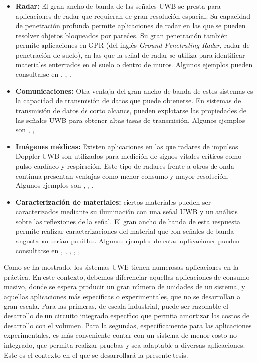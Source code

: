 \begin{itemize}
  \item \textbf{Radar:} El gran ancho de banda de las señales UWB se presta
        para aplicaciones de radar que requieran de gran resolución espacial. Su
        capacidad de penetración profunda permite aplicaciones de radar en las
        que se pueden resolver objetos bloqueados por paredes. Su gran
        penetración también permite aplicaciones en GPR (del inglés
        \textit{Ground Penetrating Radar}, radar de penetración de suelo), en
        las que la señal de radar se utiliza para identificar materiales
        enterrados en el suelo o dentro de muros. Algunos ejemplos
        pueden consultarse en \cite{morales2018}, \cite{savelyev2010},
        \cite{senapati2021}.
  \item \textbf{Comunicaciones:} Otra ventaja del gran ancho de banda de estos
        sistemas es la capacidad de transmisión de datos que puede obtenerse.  En
        sistemas de transmisión de datos de corto alcance, pueden explotarse las
        propiedades de las señales UWB para obtener altas tasas de transmisión.
        Algunos ejemplos son \cite{jaesang2004}, \cite{zhiquan2005},
        \cite{Heydari2005}
  \item \textbf{Imágenes médicas:} Existen aplicaciones en las que radares de
        impulsos Doppler UWB son utilizados para medición de signos vitales
        críticos como pulso cardíaco y respiración. Este tipo de radares frente
        a otros de onda continua presentan ventajas como menor consumo y mayor
        resolución. Algunos ejemplos son \cite{jalivand2011}, \cite{oloumi2020},
        \cite{jalivand2011_2}.
  \item \textbf{Caracterización de materiales:} ciertos materiales pueden ser
      caracterizados mediante su iluminación con una señal UWB y un análisis
        sobre las reflexiones de la señal. El gran ancho de banda de esta
        respuesta permite realizar caracterizaciones del material que con
        señales de banda angosta no serían posibles. Algunos ejemplos de estas
        aplicaciones pueden consultarse en \cite{altieri2017},
        \cite{Salman2008}, \cite{Bouza2023}, \cite{Muqaibel2003},
        \cite{salman2010performance}, \cite{Altieri2021}
\end{itemize}

Como se ha mostrado, los sistemas UWB tienen numerosas aplicaciones en la
práctica. En este contexto, debemos diferenciar aquellas aplicaciones de consumo
masivo, donde se espera producir un gran número de unidades de un sistema, y
aquellas aplicaciones más específicas o experimentales, que no se desarrollan a
gran escala. Para las primeras, de escala industrial, puede ser razonable el
desarrollo de un circuito integrado específico que permita amortizar los costos
de desarrollo con el volumen. Para la segundas, específicamente para las
aplicaciones experimentales, es más conveniente contar con un sistema de menor
costo no integrado, que permita realizar pruebas y sea adaptable a diversas
aplicaciones. Este es el contexto en el que se desarrollará la presente tesis.

